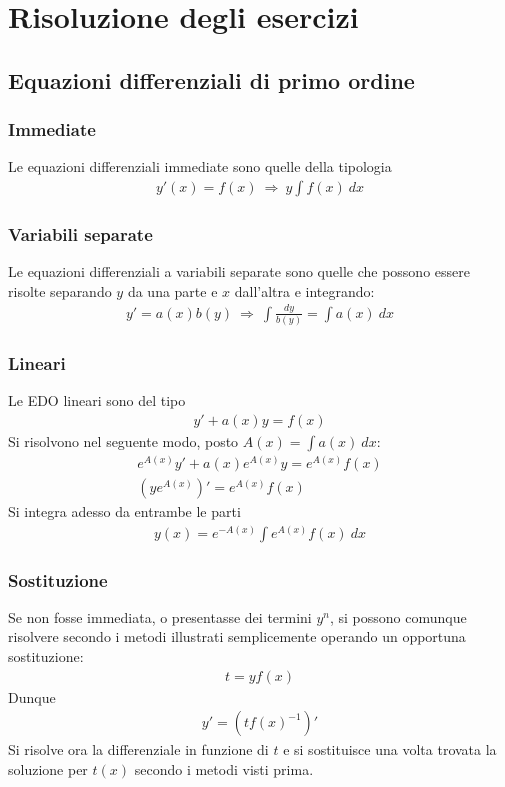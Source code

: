 \documentclass[a4paper, oneside]{book}
\begin{document}
\appendix
\chapter{Risoluzione degli esercizi}
\section{Equazioni differenziali di primo ordine}
\subsection{Immediate}
Le equazioni differenziali immediate sono quelle della tipologia
\begin{gather*}
    y'(x) = f(x)  \ \Longrightarrow \ y \int f(x) \ dx
\end{gather*}

\subsection{Variabili separate}
Le equazioni differenziali a variabili separate sono quelle che possono essere risolte 
separando $y$ da una parte e $x$ dall'altra e integrando:
\begin{gather*}
    y' = a(x) b(y) \ \Longrightarrow \ \int\frac{dy}{b(y)} = \int a(x) \ dx 
\end{gather*}

\subsection{Lineari}
Le EDO lineari sono del tipo 
\begin{gather*}
    y' + a(x) y = f(x) 
\end{gather*}
Si risolvono nel seguente modo, posto $A(x) = \int a(x)  \ dx$: 
\begin{gather*}
    e^{A(x)}y' + a(x)e^{A(x)}y = e^{A(x)}f(x)  \\
     \left(ye^{A(x)}\right)' = e^{A(x)}f(x) 
\end{gather*}
Si integra adesso da entrambe le parti 
\begin{gather*}
    y(x) = e^{-A(x)}\int e^{A(x)}f(x)  \ dx  
\end{gather*}

\subsection{Sostituzione}
Se non fosse immediata, o presentasse dei termini $y^{n}$, si possono comunque 
risolvere secondo i metodi illustrati semplicemente operando un opportuna sostituzione:
\begin{gather*}
    t = yf(x) 
\end{gather*}
Dunque 
\begin{gather*}
    y' = \left(tf(x) ^{-1}\right)' 
\end{gather*}
Si risolve ora la differenziale in funzione di $t$ e si sostituisce una 
volta trovata la soluzione per $t(x)$ secondo i metodi visti prima. 
\end{document}
